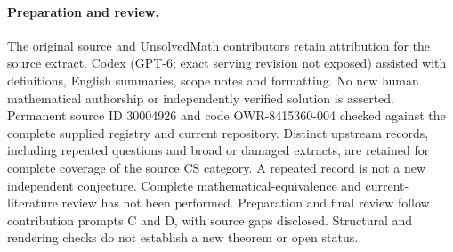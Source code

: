 \documentclass[11pt]{article}
\begin{document}
\paragraph{Preparation and review.}
The original source and UnsolvedMath contributors retain attribution for the source extract. Codex (GPT-6; exact serving revision not exposed) assisted with definitions, English summaries, scope notes and formatting. No new human mathematical authorship or independently verified solution is asserted. Permanent source ID 30004926 and code OWR-8415360-004 checked against the complete supplied registry and current repository. Distinct upstream records, including repeated questions and broad or damaged extracts, are retained for complete coverage of the source CS category. A repeated record is not a new independent conjecture. Complete mathematical-equivalence and current-literature review has not been performed. Preparation and final review follow contribution prompts C and D, with source gaps disclosed. Structural and rendering checks do not establish a new theorem or open status.
\label{end:30004926}
\end{document}
